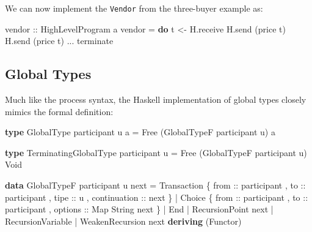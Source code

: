 \documentclass[runningheads,plain]{llncs}
\newenvironment{Shaded}{}{}
\newcommand{\KeywordTok}[1]{\textcolor[rgb]{0.00,0.44,0.13}{\textbf{#1}}}
\newcommand{\DataTypeTok}[1]{\textcolor[rgb]{0.56,0.13,0.00}{#1}}
\newcommand{\OtherTok}[1]{\textcolor[rgb]{0.00,0.44,0.13}{#1}}
\newcommand{\FunctionTok}[1]{\textcolor[rgb]{0.02,0.16,0.49}{#1}}
\newcommand{\NormalTok}[1]{#1}
\begin{document}
We can now implement the \texttt{Vendor} from the three-buyer example as:

\begin{Shaded}
\begin{Highlighting}[]
\OtherTok{vendor ::} \DataTypeTok{HighLevelProgram}\NormalTok{ a}
\NormalTok{vendor }\FunctionTok{=} \KeywordTok{do}
\NormalTok{    t }\OtherTok{<-}\NormalTok{ H.receive}
\NormalTok{    H.send (price t)}
\NormalTok{    H.send (price t)}
    \FunctionTok{...}
\NormalTok{    terminate}
\end{Highlighting}
\end{Shaded}

\subsection{Global Types}

Much like the process syntax, the Haskell implementation of global types closely mimics the formal definition:

\begin{Shaded}
\begin{Highlighting}[]
\KeywordTok{type} \DataTypeTok{GlobalType}\NormalTok{ participant u a }\FunctionTok{=} 
    \DataTypeTok{Free}\NormalTok{ (}\DataTypeTok{GlobalTypeF}\NormalTok{ participant u) a }

\KeywordTok{type} \DataTypeTok{TerminatingGlobalType}\NormalTok{ participant u }\FunctionTok{=} 
    \DataTypeTok{Free}\NormalTok{ (}\DataTypeTok{GlobalTypeF}\NormalTok{ participant u) }\DataTypeTok{Void}

\KeywordTok{data} \DataTypeTok{GlobalTypeF}\NormalTok{ participant u next}
    \FunctionTok{=} \DataTypeTok{Transaction} 
\NormalTok{        \{}\OtherTok{ from ::}\NormalTok{ participant}
\NormalTok{        ,}\OtherTok{ to ::}\NormalTok{ participant}
\NormalTok{        ,}\OtherTok{ tipe ::}\NormalTok{ u}
\NormalTok{        ,}\OtherTok{ continuation ::}\NormalTok{  next }
\NormalTok{        \} }
    \FunctionTok{|} \DataTypeTok{Choice} 
\NormalTok{        \{}\OtherTok{ from ::}\NormalTok{ participant}
\NormalTok{        ,}\OtherTok{ to ::}\NormalTok{ participant}
\NormalTok{        ,}\OtherTok{ options ::} \DataTypeTok{Map} \DataTypeTok{String}\NormalTok{ next }
\NormalTok{        \}}
    \FunctionTok{|} \DataTypeTok{End}
    \FunctionTok{|} \DataTypeTok{RecursionPoint}\NormalTok{ next}
    \FunctionTok{|} \DataTypeTok{RecursionVariable}
    \FunctionTok{|} \DataTypeTok{WeakenRecursion}\NormalTok{ next}
    \KeywordTok{deriving}\NormalTok{ (}\DataTypeTok{Functor}\NormalTok{)}
\end{Highlighting}
\end{Shaded}
\end{document}
